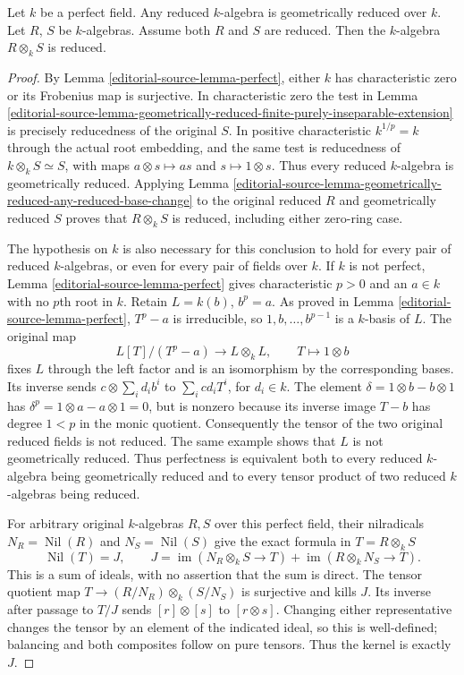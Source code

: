 \begin{lemma}
\label{editorial-source-lemma-perfect-reduced}
Let $k$ be a perfect field.
Any reduced $k$-algebra is geometrically reduced over $k$.
Let $R$, $S$ be $k$-algebras.
Assume both $R$ and $S$ are reduced.
Then the $k$-algebra $R \otimes_k S$ is reduced.
\end{lemma}

\begin{proof}
By Lemma \ref{editorial-source-lemma-perfect}, either $k$ has
characteristic zero or its Frobenius map is
surjective. In characteristic zero the test
in Lemma
\ref{editorial-source-lemma-geometrically-reduced-finite-purely-inseparable-extension}
is precisely reducedness of the original $S$.
In positive characteristic $k^{1/p}=k$ through
the actual root embedding, and the same test
is reducedness of $k\otimes_k S\simeq S$,
with maps $a\otimes s\mapsto as$ and
$s\mapsto1\otimes s$. Thus every reduced
$k$-algebra is geometrically reduced. Applying
Lemma \ref{editorial-source-lemma-geometrically-reduced-any-reduced-base-change}
to the original reduced $R$ and geometrically
reduced $S$ proves that $R\otimes_k S$ is
reduced, including either zero-ring case.

The hypothesis on $k$ is also necessary for
this conclusion to hold for every pair of
reduced $k$-algebras, or even for every pair
of fields over $k$. If $k$ is not perfect,
Lemma \ref{editorial-source-lemma-perfect} gives characteristic
$p>0$ and an $a\in k$ with no $p$th root in
$k$. Retain $L=k(b)$, $b^p=a$. As proved in
Lemma \ref{editorial-source-lemma-perfect}, $T^p-a$ is
irreducible, so $1,b,\ldots,b^{p-1}$ is a
$k$-basis of $L$. The original map
$$
L[T]/(T^p-a)\longrightarrow L\otimes_k L,
\qquad T\longmapsto1\otimes b
$$
fixes $L$ through the left factor and is an
isomorphism by the corresponding bases.
Its inverse sends $c\otimes\sum_i d_i b^i$
to $\sum_i cd_i T^i$, for $d_i\in k$.
The element $\delta=1\otimes b-b\otimes1$
has $\delta^p=1\otimes a-a\otimes1=0$,
but is nonzero because its inverse image
$T-b$ has degree $1<p$ in the monic
quotient. Consequently the tensor of the
two original reduced fields is not reduced.
The same example shows that $L$ is not
geometrically reduced. Thus perfectness is
equivalent both to every reduced $k$-algebra
being geometrically reduced and to every
tensor product of two reduced $k$-algebras
being reduced.

For arbitrary original $k$-algebras $R,S$
over this perfect field, their nilradicals
$N_R=\operatorname{Nil}(R)$ and
$N_S=\operatorname{Nil}(S)$ give the exact
formula in $T=R\otimes_k S$
$$
\operatorname{Nil}(T)=J,
\qquad
J=\operatorname{im}(N_R\otimes_k S\to T)
+\operatorname{im}(R\otimes_k N_S\to T).
$$
This is a sum of ideals, with no assertion
that the sum is direct. The tensor quotient
map $T\to (R/N_R)\otimes_k(S/N_S)$ is
surjective and kills $J$. Its inverse
after passage to $T/J$ sends
$[r]\otimes[s]$ to $[r\otimes s]$.
Changing either representative changes
the tensor by an element of the indicated
ideal, so this is well-defined; balancing
and both composites follow on pure tensors.
Thus the kernel is exactly $J$.


\end{proof}
